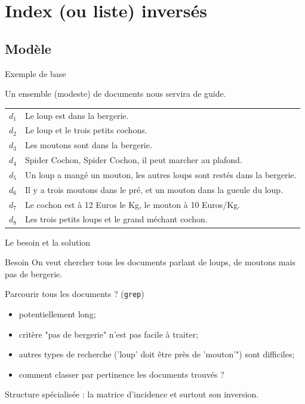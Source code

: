 \section{Index (ou liste) inversés}

\subsection{Modèle}

\begin{frame}{Exemple de base}

  Un ensemble (modeste) de documents nous servira de guide.

  \vspace{.5cm}

  \begin{tabular}{>{\color{structure.fg}}ll}
    $d_1$&Le loup est dans la bergerie.\\
    $d_2$&Le loup et le trois petits cochons.\\
    $d_3$&Les moutons sont dans la bergerie.\\
    $d_4$&Spider Cochon, Spider Cochon, il peut marcher au plafond.\\
    $d_5$&Un loup a mangé un mouton, les autres loups sont restés dans la bergerie.\\
    $d_6$&Il y a trois moutons dans le pré, et un mouton dans la gueule du loup.\\
    $d_7$&Le cochon est à 12 Euros le Kg, le mouton à 10 Euros/Kg.\\
    $d_8$&Les trois petits loups et le grand méchant cochon.\\
  \end{tabular}

\end{frame}

\begin{frame}{Le besoin et la solution}

  \begin{defblock}{Besoin}
    On veut chercher tous les documents parlant de loups, de moutons mais pas de
    bergerie.
  \end{defblock}

  \medskip

  \alert{Parcourir tous les documents ?} (\texttt{grep})
  \begin{itemize}
    \item potentiellement long;
    \item critère "pas de bergerie" n'est pas facile à traiter;
    \item autres types de recherche ('loup' doit être \alert{près} de 'mouton'") sont
      difficiles;
    \item comment \alert{classer} par pertinence les documents trouvés ?
  \end{itemize}

  \vfill
\begin{blocgauche}
  Structure spécialisée : la \alert{matrice d'incidence} et surtout son inversion.
\end{blocgauche}
\end{frame}

